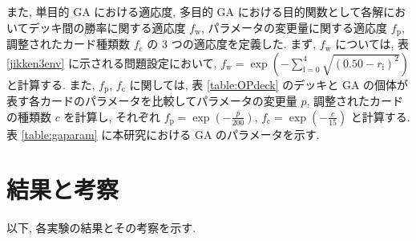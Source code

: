 \documentclass[twocolumn]{jarticle}
\begin{document}
また, 単目的 GA における適応度, 多目的 GA における目的関数として各解においてデッキ間の勝率に関する適応度 $f_\mathrm{w}$,  パラメータの変更量に関する適応度 $f_\mathrm{p}$, 調整されたカード種類数 $f_\mathrm{c}$ の 3 つの適応度を定義した.
まず, $f_\mathrm{w}$ については, 表 \ref{jikken3env} に示される問題設定において, $f_\mathrm{w} = \exp(-\sum_{\mathrm{i}=0}^4 \sqrt{(0.50 - r_\mathrm{i})^2})$ と計算する.
また, $f_\mathrm{p}$, $f_\mathrm{c}$ に関しては, 表 \ref{table:OPdeck} のデッキと GA の個体が表す各カードのパラメータを比較してパラメータの変更量 $p$, 調整されたカードの種類数 $c$ を計算し, それぞれ $f_\mathrm{p} = \exp(-\frac{p}{200})$, $f_\mathrm{c} = \exp(-\frac{c}{15})$ と計算する.
表 \ref{table:gaparam} に本研究における GA のパラメータを示す.

     \section{結果と考察}
     以下, 各実験の結果とその考察を示す.
     
\end{document}
